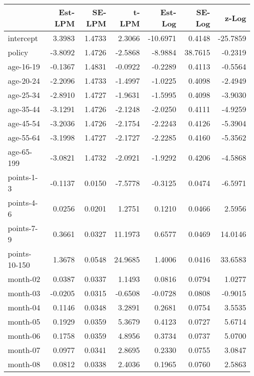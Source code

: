 \documentclass[10pt]{article}
\begin{document}

\begin{table}[ht]
\centering
\begin{tabular}{lrrrrrr}
  \hline
 & Est-LPM & SE-LPM & t-LPM & Est-Log & SE-Log & z-Log \\ 
  \hline
intercept & 3.3983 & 1.4733 & 2.3066 & -10.6971 & 0.4148 & -25.7859 \\ 
  policy & -3.8092 & 1.4726 & -2.5868 & -8.9884 & 38.7615 & -0.2319 \\ 
  age-16-19 & -0.1367 & 1.4831 & -0.0922 & -0.2289 & 0.4113 & -0.5564 \\ 
  age-20-24 & -2.2096 & 1.4733 & -1.4997 & -1.0225 & 0.4098 & -2.4949 \\ 
  age-25-34 & -2.8910 & 1.4727 & -1.9631 & -1.5995 & 0.4098 & -3.9030 \\ 
  age-35-44 & -3.1291 & 1.4726 & -2.1248 & -2.0250 & 0.4111 & -4.9259 \\ 
  age-45-54 & -3.2036 & 1.4726 & -2.1754 & -2.2243 & 0.4126 & -5.3904 \\ 
  age-55-64 & -3.1998 & 1.4727 & -2.1727 & -2.2285 & 0.4160 & -5.3562 \\ 
  age-65-199 & -3.0821 & 1.4732 & -2.0921 & -1.9292 & 0.4206 & -4.5868 \\ 
  points-1-3 & -0.1137 & 0.0150 & -7.5778 & -0.3125 & 0.0474 & -6.5971 \\ 
  points-4-6 & 0.0256 & 0.0201 & 1.2751 & 0.1210 & 0.0466 & 2.5956 \\ 
  points-7-9 & 0.3661 & 0.0327 & 11.1973 & 0.6577 & 0.0469 & 14.0146 \\ 
  points-10-150 & 1.3678 & 0.0548 & 24.9685 & 1.4006 & 0.0416 & 33.6583 \\ 
  month-02 & 0.0387 & 0.0337 & 1.1493 & 0.0816 & 0.0794 & 1.0277 \\ 
  month-03 & -0.0205 & 0.0315 & -0.6508 & -0.0728 & 0.0808 & -0.9015 \\ 
  month-04 & 0.1146 & 0.0348 & 3.2891 & 0.2681 & 0.0754 & 3.5535 \\ 
  month-05 & 0.1929 & 0.0359 & 5.3679 & 0.4123 & 0.0727 & 5.6714 \\ 
  month-06 & 0.1758 & 0.0359 & 4.8956 & 0.3734 & 0.0737 & 5.0700 \\ 
  month-07 & 0.0977 & 0.0341 & 2.8695 & 0.2330 & 0.0755 & 3.0847 \\ 
  month-08 & 0.0812 & 0.0338 & 2.4036 & 0.1965 & 0.0760 & 2.5863 \\ 

\end{tabular}
\end{table}
\end{document}
